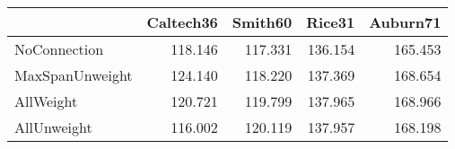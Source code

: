 \begin{tabular}{lrrrr}
\toprule
{} & Caltech36 & Smith60 &  Rice31 & Auburn71 \\
\midrule
NoConnection    &   118.146 & 117.331 & 136.154 &  165.453 \\
MaxSpanUnweight &   124.140 & 118.220 & 137.369 &  168.654 \\
AllWeight       &   120.721 & 119.799 & 137.965 &  168.966 \\
AllUnweight     &   116.002 & 120.119 & 137.957 &  168.198 \\
\bottomrule
\end{tabular}
